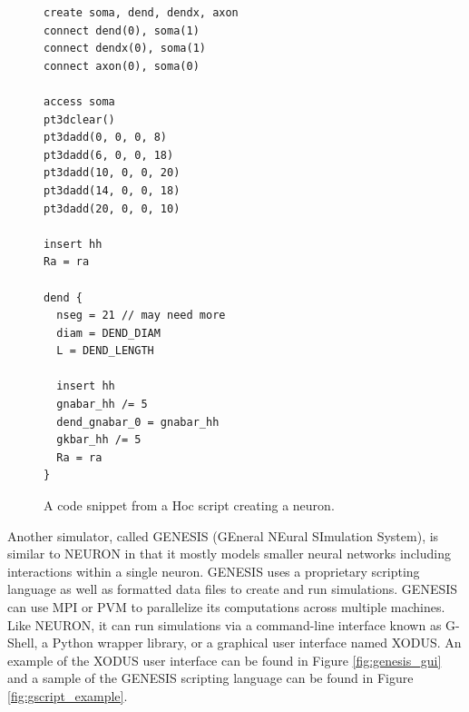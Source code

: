 \begin{figure}
\begin{center}
\begin{lstlisting}
create soma, dend, dendx, axon
connect dend(0), soma(1)
connect dendx(0), soma(1)
connect axon(0), soma(0)

access soma
pt3dclear()
pt3dadd(0, 0, 0, 8)
pt3dadd(6, 0, 0, 18)
pt3dadd(10, 0, 0, 20)
pt3dadd(14, 0, 0, 18)
pt3dadd(20, 0, 0, 10)

insert hh
Ra = ra

dend {
  nseg = 21	// may need more
  diam = DEND_DIAM
  L = DEND_LENGTH

  insert hh
  gnabar_hh /= 5
  dend_gnabar_0 = gnabar_hh
  gkbar_hh /= 5
  Ra = ra
}
\end{lstlisting}
\caption[NEURON Hoc Example \cite{carenvale2006neuron}]{A code snippet from a Hoc script creating a neuron\cite{carenvale2006neuron}.\label{fig:hoc_example}}
\end{center}
\end{figure}

Another simulator, called GENESIS (GEneral NEural SImulation System)\cite{brette2007simulation}, is similar to NEURON in that it mostly models smaller neural networks including interactions within a single neuron\cite{bower1995book}. GENESIS uses a proprietary scripting language as well as formatted data files to create and run simulations. GENESIS can use MPI or PVM to parallelize its computations across multiple machines. Like NEURON, it can run simulations via a command-line interface known as G-Shell, a Python wrapper library, or a graphical user interface named XODUS\cite{brette2007simulation}. An example of the XODUS user interface can be found in Figure \ref{fig:genesis_gui} and a sample of the GENESIS scripting language can be found in Figure \ref{fig:gscript_example}\cite{bower1995book, brette2007simulation}.

